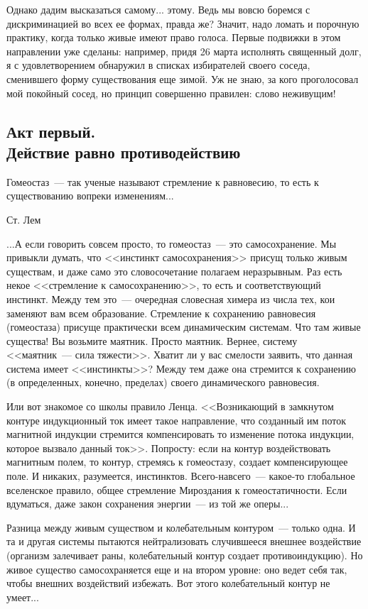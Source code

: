 \documentclass{scrbook}
\makeatletter
\newcommand{\defaultepigraphwidth}{0.5} %
\newcommand{\flqq}{<<}
\newcommand{\frqq}{>>}
\newcommand{\mdash}{~--- }
\newcommand{\essaysection}[1]{\subsection*{#1}\nopagebreak}
\newcommand{\myepigraph}[3][\@empty]{
	\ifx\@empty#1
		\setlength{\epigraphwidth}{\defaultepigraphwidth\textwidth}
	\else
		\setlength{\epigraphwidth}{#1\textwidth}
	\fi
	\epigraph{#2}{#3}
	\setlength{\epigraphwidth}{\defaultepigraphwidth\textwidth} %
	\nopagebreak
}
\makeatother
\begin{document}
Однако дадим высказаться самому... этому. Ведь мы вовсю боремся с дискриминацией во всех ее формах, правда же? Значит, надо ломать и порочную практику, когда только живые имеют право голоса. Первые подвижки в этом направлении уже сделаны: например, придя 26 марта исполнять священный долг, я с удовлетворением обнаружил в списках избирателей своего соседа, сменившего форму существования еще зимой. Уж не знаю, за кого проголосовал мой покойный сосед, но принцип совершенно правилен: слово неживущим!

\essaysection{Акт первый. \\ Действие равно противодействию}

\myepigraph{Гомеостаз{\mdash}так ученые называют стремление к равновесию, то есть к существованию вопреки изменениям...}
{Ст. Лем}

...А если говорить совсем просто, то гомеостаз{\mdash}это самосохранение. Мы привыкли думать, что {\flqq}инстинкт самосохранения{\frqq} присущ только живым существам, и даже само это словосочетание полагаем неразрывным. Раз есть некое {\flqq}стремление к самосохранению{\frqq}, то есть и соответствующий инстинкт. Между тем это{\mdash}очередная словесная химера из числа тех, кои заменяют вам всем образование. Стремление к сохранению равновесия (гомеостаза) присуще практически всем динамическим системам. Что там живые существа! Вы возьмите маятник. Просто маятник. Вернее, систему {\flqq}маятник{\mdash}сила тяжести{\frqq}. Хватит ли у вас смелости заявить, что данная система имеет {\flqq}инстинкты{\frqq}? Между тем даже она стремится к сохранению (в определенных, конечно, пределах) своего динамического равновесия.

Или вот знакомое со школы правило Ленца. {\flqq}Возникающий в замкнутом контуре индукционный ток имеет такое направление, что созданный им поток магнитной индукции стремится компенсировать то изменение потока индукции, которое вызвало данный ток{\frqq}. Попросту: если на контур воздействовать магнитным полем, то контур, стремясь к гомеостазу, создает компенсирующее поле. И никаких, разумеется, инстинктов. Всего-навсего{\mdash}какое-то глобальное вселенское правило, общее стремление Мироздания к гомеостатичности. Если вдуматься, даже закон сохранения энергии{\mdash}из той же оперы...

Разница между живым существом и колебательным контуром{\mdash}только одна. И та и другая системы пытаются нейтрализовать случившееся внешнее воздействие (организм залечивает раны, колебательный контур создает противоиндукцию). Но живое существо самосохраняется еще и на втором уровне: оно ведет себя так, чтобы внешних воздействий избежать. Вот этого колебательный контур не умеет...
\end{document}
